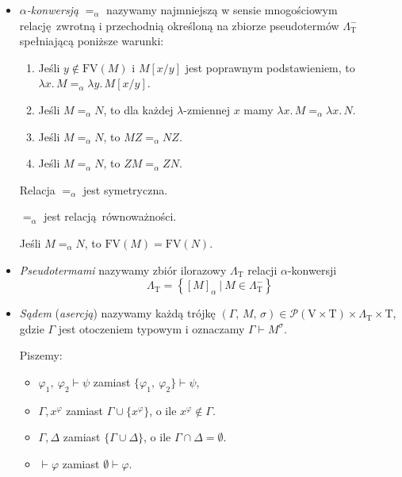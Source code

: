 \begin{definicja}
\begin{itemize}
  \item \emph{\(\alpha\)-konwersją} \(=_\alpha\) nazywamy najmniejszą w sensie mnogościowym relację zwrotną i przechodnią określoną na zbiorze pseudotermów \(\Lambda^{-}_{\mathrm{T}}\) spełniającą poniższe warunki:
    \begin{enumerate}[label=({\alph*})]
      \item Jeśli \(y\not\in \mathrm{FV}(M)\) i \(M[x/y]\) jest poprawnym podstawieniem, to \(\lambda x.\, M  =_\alpha \lambda y.\, M[x/y]\).
      \item Jeśli \(M=_\alpha N\), to dla każdej \(\lambda\)-zmiennej \(x\) mamy \(\lambda x.\, M =_\alpha \lambda x.\,N\).
      \item Jeśli \(M=_\alpha N\), to \(M Z=_\alpha N Z\).
      \item Jeśli \(M=_\alpha N\), to \(ZM =_\alpha ZN\).
    \end{enumerate}
    \begin{fakt}
      Relacja \(=_{\alpha}\) jest symetryczna.
    \end{fakt}
    \begin{fakt}
      \(=_{\alpha}\) jest relacją równoważności.
    \end{fakt}
    \begin{fakt}
      Jeśli \(M=_\alpha N\), to \(\mathrm{FV}(M)=\mathrm{FV}(N)\).
    \end{fakt}
  \item \emph{Pseudotermami} nazywamy zbiór ilorazowy \(\Lambda_\mathrm{T}\) relacji \(\alpha\)-konwersji
  \[
    \Lambda_{\mathrm{T}}=\left\{[M]_\alpha\:|\: M\in\Lambda^{-}_\mathrm{T}\right\}
  \]
\item
    \emph{Sądem} (\emph{asercją}) nazywamy każdą trójkę \((\Gamma ,\,M,\,\sigma )\in\mathcal{P}(\mathrm{V}\times \mathrm{T})\times\Lambda_{\mathrm{T}}\times\mathrm{T}\), gdzie \(\Gamma\) jest otoczeniem typowym i oznaczamy \(\Gamma\vdash M^{\sigma}\).

  Piszemy: \begin{itemize}
    \item \(\varphi_{1},\ \varphi_{2}\vdash\psi\) zamiast \(\{\varphi_{1},\ \varphi_{2}\}\vdash\psi\),
    \item \(\Gamma, x^\varphi\) zamiast \(\Gamma\cup \{x^\varphi\}\), o ile \(x^\varphi\not\in \Gamma\).
    \item \(\Gamma, \Delta\) zamiast \(\{\Gamma\cup \Delta\}\), o ile \(\Gamma\cap\Delta=\emptyset\).
    \item \(\vdash\varphi\) zamiast \(\emptyset\vdash\varphi\).
  \end{itemize}


\end{itemize}
\end{definicja}
